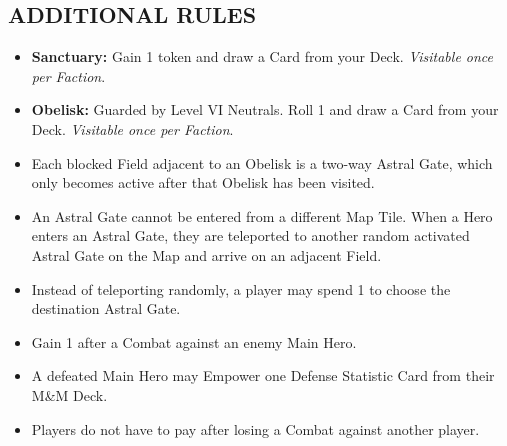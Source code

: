 \begin{multicols}{2}

\subsection*{\MakeUppercase{Additional Rules}}
\begin{itemize}
  \item \textbf{Sanctuary:} Gain 1  token and draw a Card from your Deck. \textit{Visitable once per Faction}.
  \item \textbf{Obelisk:} Guarded by Level VI Neutrals. Roll 1  and draw a Card from your Deck. \textit{Visitable once per Faction}.
  \item Each blocked Field adjacent to an Obelisk is a two-way Astral Gate, which only becomes active after that Obelisk has been visited.
  \item An Astral Gate cannot be entered from a different Map Tile. When a Hero enters an Astral Gate, they are teleported to another random activated Astral Gate on the Map and arrive on an adjacent Field.
  \item Instead of teleporting randomly, a player may spend 1  to choose the destination Astral Gate.
  \item Gain 1  after a Combat against an enemy Main Hero.
  \item A defeated Main Hero may Empower one Defense Statistic Card from their M\&M Deck.
  \item Players do not have to pay  after losing a Combat against another player.
\end{itemize}

\end{multicols}


